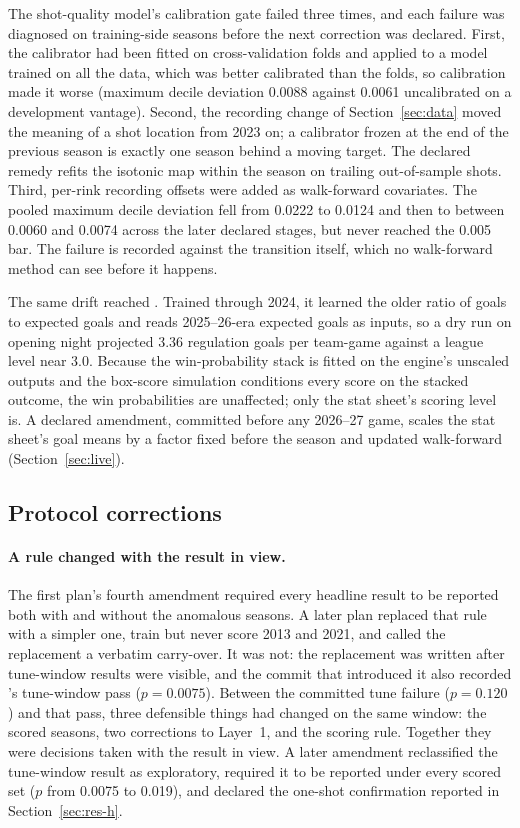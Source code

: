The shot-quality model's calibration gate failed three times, and each failure
was diagnosed on training-side seasons before the next correction was
declared. First, the calibrator had been fitted on cross-validation folds and
applied to a model trained on all the data, which was better calibrated than
the folds, so calibration made it worse (maximum decile deviation 0.0088
against 0.0061 uncalibrated on a development vantage). Second, the recording
change of Section~\ref{sec:data} moved the meaning of a shot location from 2023
on; a calibrator frozen at the end of the previous season is exactly one
season behind a moving target. The declared remedy refits the isotonic map
within the season on trailing out-of-sample shots. Third, per-rink recording
offsets were added as walk-forward covariates. The pooled maximum decile
deviation fell from 0.0222 to 0.0124 and then to between 0.0060 and 0.0074
across the later declared stages, but never reached the 0.005 bar. The failure
is recorded against the transition itself, which no walk-forward method can
see before it happens.

The same drift reached \neurhlG{}. Trained through 2024, it learned the older ratio
of goals to expected goals and reads 2025--26-era expected goals as inputs, so
a dry run on opening night projected 3.36 regulation goals per team-game
against a league level near 3.0. Because the win-probability stack is fitted on
the engine's unscaled outputs and the box-score simulation conditions every
score on the stacked outcome, the win probabilities are unaffected; only the
stat sheet's scoring level is. A declared amendment, committed before any
2026--27 game, scales the stat sheet's goal means by a factor fixed before the
season and updated walk-forward (Section~\ref{sec:live}).

\subsection{Protocol corrections}

\paragraph{A rule changed with the result in view.}
The first plan's fourth amendment required every headline result to be
reported both with and without the anomalous seasons. A later plan replaced
that rule with a simpler one, train but never score 2013 and 2021, and called
the replacement a verbatim carry-over. It was not: the replacement was written
after tune-window results were visible, and the commit that introduced it also
recorded \neurhlH{}'s tune-window pass ($p = 0.0075$). Between the committed tune
failure ($p = 0.120$) and that pass, three defensible things had changed on the
same window: the scored seasons, two corrections to Layer~1, and the scoring
rule. Together they were decisions taken with the result in view. A later
amendment reclassified the tune-window result as exploratory, required it to
be reported under every scored set ($p$ from 0.0075 to 0.019), and declared the
one-shot confirmation reported in Section~\ref{sec:res-h}.

